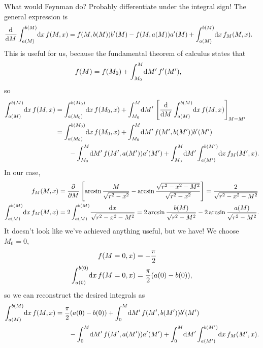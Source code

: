 What would Feynman do?
Probably differentiate under the integral sign!
The general expression is~\cite{flanders1973differentiation}
\begin{align}
	\dod{}{M} \int_{a(M)}^{b(M)}\! \dif x \, f(M, x)
	&= f(M, b(M)) b'(M) - f(M, a(M)) a'(M) + \int_{a(M)}^{b(M)}\! \dif x \, f_M(M, x).
\end{align}
This is useful for us, because the fundamental theorem of calculus states that~\cite[384]{stewart2008calculus}
\begin{align}
	f(M)
	&= f(M_0) + \int_{M_0}^M\! \dif M' \, f'(M'),
\end{align}
so
\begin{subequations}
\begin{align}
	\int_{a(M)}^{b(M)}\! \dif x \, f(M, x)
	&= \int_{a(M_0)}^{b(M_0)}\! \dif x \, f(M_0, x)
		+ \int_{M_0}^M\! \dif M' \, \left[ \dod{}{M} \int_{a(M)}^{b(M)}\! \dif x \, f(M, x) \right]_{M = M'} \\
	&= \int_{a(M_0)}^{b(M_0)}\! \dif x \, f(M_0, x) + \int_{M_0}^M\! \dif M' \, f(M', b(M')) b'(M') \notag \\
	&\qquad
		- \int_{M_0}^M\! \dif M' \, f(M', a(M')) a'(M') + \int_{M_0}^M\! \dif M' \int_{a(M')}^{b(M')}\! \dif x \, f_M(M', x).
\end{align}
\end{subequations}
In our case,
\begin{subequations}
\begin{align}
	f_M(M, x)
	&= \dpd{}{M} \left[ \arcsin{\frac{M}{\sqrt{r^2 - x^2}}} - \arcsin{\frac{\sqrt{r^2 - x^2 - M^2}}{\sqrt{r^2 - x^2}}} \right]
	= \frac{2}{\sqrt{r^2 - x^2 - M^2}} \\
	\int_{a(M)}^{b(M)}\! \dif x \, f_M(M, x)
	&= 2 \int_{a(M)}^{b(M)}\! \frac{\dif x}{\sqrt{r^2 - x^2 - M^2}}
	= 2 \arcsin{\frac{b(M)}{\sqrt{r^2 - M^2}}} - 2 \arcsin{\frac{a(M)}{\sqrt{r^2 - M^2}}}.
\end{align}
\end{subequations}
It doesn't look like we've achieved anything useful, but we have!
We choose $M_0 = 0$,
\begin{subequations}
\begin{align}
	f(M = 0, x)
	&= -\frac{\pi}{2} \\
	\int_{a(0)}^{b(0)}\! \dif x \, f(M = 0, x)
	&= \frac{\pi}{2} (a(0) - b(0)),
\end{align}
\end{subequations}
so we can reconstruct the desired integrals as
\begin{align}
	\int_{a(M)}^{b(M)}\! \dif x \, f(M, x)
	&= \frac{\pi}{2} (a(0) - b(0)) + \int_0^M\! \dif M' \, f(M', b(M')) b'(M') \notag \\
	&\qquad
		- \int_0^M\! \dif M' \, f(M', a(M')) a'(M') + \int_0^M\! \dif M' \int_{a(M')}^{b(M')}\! \dif x \, f_M(M', x).
\end{align}


